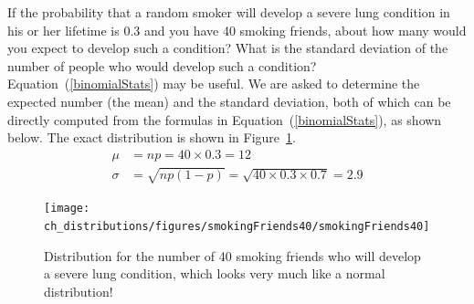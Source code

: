 \begin{example}{If the probability that a random smoker will develop a severe lung condition in his or her lifetime is $0.3$ and you have 40 smoking friends, about how many would you expect to develop such a condition? What is the standard deviation of the number of people who would develop such a condition? Equation~(\ref{binomialStats}) may be useful.}
We are asked to determine the expected number (the mean) and the standard deviation, both of which can be directly computed from the formulas in Equation~(\ref{binomialStats}), as shown below. The exact distribution is shown in Figure~\ref{smokingFriends40}.
 \begin{align*}
\mu&=np = 40\times 0.3 = 12 \\
 \sigma &= \sqrt{np(1-p)} = \sqrt{40\times 0.3\times 0.7} = 2.9
\end{align*}
\end{example}

\begin{figure}[ht]
\centering
\texttt{[image: ch\_distributions/figures/smokingFriends40/smokingFriends40]}
\caption{Distribution for the number of 40 smoking friends who will develop a severe lung condition, which looks very much like a normal distribution!} %
\label{smokingFriends40}
\end{figure}


%
%


